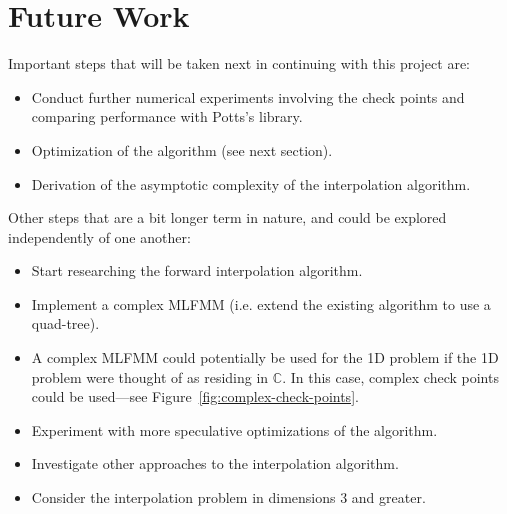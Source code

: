 \section{Future Work}

Important steps that will be taken next in continuing with this
project are:
\begin{itemize}
\item Conduct further numerical experiments involving the check points
  and comparing performance with Potts's library.
\item Optimization of the algorithm (see next section).
\item Derivation of the asymptotic complexity of the interpolation
  algorithm.
\end{itemize}
Other steps that are a bit longer term in nature, and could be
explored independently of one another:
\begin{itemize}
\item Start researching the forward interpolation algorithm.
\item Implement a complex MLFMM (i.e. extend the existing algorithm to
  use a quad-tree).
\item A complex MLFMM could potentially be used for the 1D problem if
  the 1D problem were thought of as residing in $\mathbb{C}$. In this
  case, complex check points could be used\----see
  Figure~\ref{fig:complex-check-points}.
\item Experiment with more speculative optimizations of the algorithm.
\item Investigate other approaches to the interpolation algorithm.
\item Consider the interpolation problem in dimensions 3 and greater.
\end{itemize}

